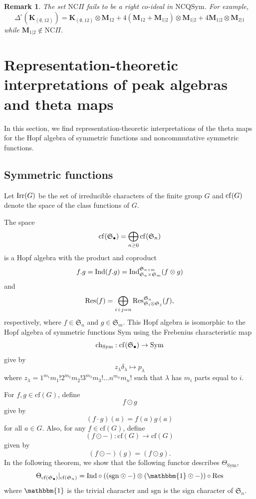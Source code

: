 \documentclass[11pt]{amsart}
\newtheorem{Remark}[Theorem]{Remark}
\numberwithin{equation}{section}
\newcommand{\NCQSym}{\mathrm{NCQSym}}
\newcommand{\Sym}{\mathrm{Sym}}
\newcommand{\NCPeak}{\mathrm{NC}\Pi}
\newcommand{\bbmone}{{\mathbbm{1}}}
\newcommand{\frakS}{{\mathfrak{S}}}
\newcommand{\cf}{{\mathrm{cf}}}
\newcommand{\sgn}{{\mathrm{sgn}}}
\begin{document}
\begin{Remark}
	The set $\NCPeak$ fails to be a right co-ideal in $\NCQSym$. For example,
	$$\Delta^\circ(\mathbf{K}_{(\emptyset,12)})=\mathbf{K}_{(\emptyset,12)}\otimes\mathbf{M}_{12}+4(\mathbf{M}_{12}+\mathbf{M}_{1|2})\otimes\mathbf{M}_{1|2}+4\mathbf{M}_{1|2}\otimes\mathbf{M}_{2|1}$$
	while $\mathbf{M}_{1|2}\notin\NCPeak$.
\end{Remark}


\section{Representation-theoretic interpretations of peak algebras and theta maps}\label{Sec:rep}
In this section, we find representation-theoretic interpretations of the theta maps for the Hopf algebra of symmetric functions and noncommutative symmetric functions. 
\subsection{Symmetric functions}

Let ${\rm Irr}(G)$ be the set of irreducible characters of the finite group $G$ and ${\rm cf}(G)$ denote the space of the class functions of $G$. 


The space $${\rm cf}(\mathfrak{S}_\bullet)=\bigoplus_{n\geq 0}{\rm cf}(\mathfrak{S}_n)$$  is a Hopf algebra with the product and coproduct
$$f . g = {\rm Ind}(f.g) = {\rm Ind}_{\mathfrak{S}_n\times \mathfrak{S}_m}^{\mathfrak{S}_{n+m}} (f\otimes g)$$ and $${\rm Res}(f) = \bigoplus_{i+j=n}{\rm Res}_{\mathfrak{S}_i\otimes \mathfrak{S}_j}^{\frakS_n} (f),$$ respectively, where $f\in\frakS_n$ and $g\in \frakS_m$. This Hopf algebra is isomorphic to the Hopf algebra of symmetric functions $\Sym$ using the Frebenius characteristic map 
$${\rm ch}_{\Sym}: \cf(\frakS_\bullet) \rightarrow \Sym$$ give by 
$$z_\lambda \delta_\lambda \mapsto p_\lambda$$ where $z_\lambda = 1^{m_1}m_1! 2^{m_2} m_2! 3^{m_3} m_3! \dots n^{m_n}m_n!$ such that $\lambda$ has $m_i$ parts equal to $i$.   


For $f,g\in \cf(G)$, define $$f\odot g$$ give by $$(f \cdot g)(a)=f(a)g(a)$$ for all $a\in G$. Also, for any $f \in \cf(G)$, define $$(f\odot -):\cf(G)\rightarrow \cf(G)$$ given by 
$$(f\odot -)(g) = (f\odot g).$$ In the following theorem, we show that the following functor describes $\Theta_\Sym$,
$$\Theta_{\cf(\frakS_\bullet)}|_{\cf(\frakS_n)}=  {\rm Ind} \circ ((\sgn\odot -) \otimes (\mathbbm{1}\odot -)) \circ {\rm Res}$$ where $\bbmone$ is the trivial character and $\sgn$ is the sign character of $\frakS_n$.
\end{document}

